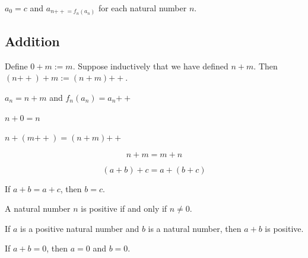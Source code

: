 \documentclass{blog}
\begin{document}
\begin{lemma}
  $a_{0} = c$ and $a_{n{++} = f_{n}(a_{n})}$ for each natural number $n$.
\end{lemma}

\subsection{Addition}
\begin{definition}[addition]
  Define $0+m:=m$. Suppose inductively that we have defined $n+m$.
  Then $(n{++})+m:=(n+m){++}$.
\end{definition}

$a_{n} = n+m$ and $f_{n}(a_{n}) = a_{n}{++}$

\begin{lemma}
  $n+0=n$
\end{lemma}

\begin{lemma}
  $n+(m{++})=(n+m){++}$
\end{lemma}

\begin{proposition}
  \begin{equation}
    n+m = m+n
  \end{equation}
\end{proposition}

\begin{proposition}
  \begin{equation}
    (a+b)+c = a+(b+c)
  \end{equation}
\end{proposition}

\begin{proposition}
  If $a+b = a+c$, then $b=c$.
\end{proposition}

\begin{definition}
  A natural number $n$ is positive if and only if $n \neq 0$.
\end{definition}

\begin{lemma}
  If $a$ is a positive natural number and $b$ is a natural number,
  then $a+b$ is positive.
\end{lemma}

\begin{lemma}
  If $a+b = 0$, then $a=0$ and $b=0$.
\end{lemma}
\end{document}

